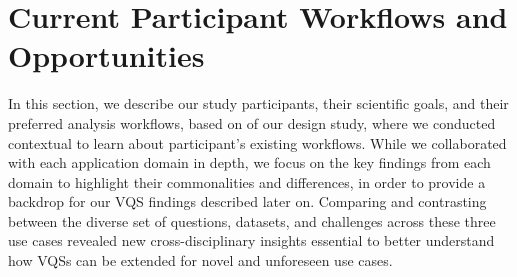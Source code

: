  \section{Current Participant Workflows and Opportunities\label{sec:participantdatasets}}
 In this section, we describe our study participants, their scientific goals, and their preferred analysis workflows, based on  of our design study, where we conducted contextual  to learn about participant's existing workflows. %
 While we collaborated with each application domain in depth, we focus on the key findings from each domain to highlight their commonalities and differences, in order to provide a backdrop for our VQS findings described later on. Comparing and contrasting between the diverse set of questions, datasets, and challenges across these three use cases revealed new cross-disciplinary insights essential to better understand how VQSs can be extended for novel and unforeseen use cases.
